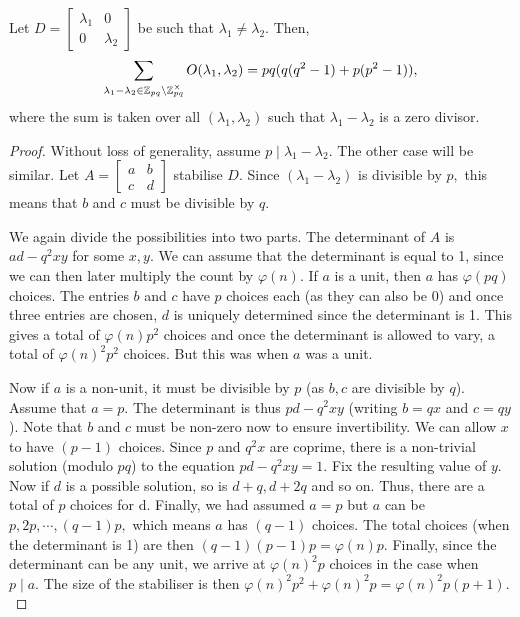 \documentclass[11pt, titlepage, a4paper]{article}
\begin{document}
\begin{proposition}\label{o2}
 Let $D = \begin{bmatrix}
 \lambda_{1} & 0 \\
 0 & \lambda_{2}
\end{bmatrix}$ be such that $\lambda_{1}\neq \lambda_{2}.$ Then,
\begin{align*}
\sum_{\lambda_{1}-\lambda_{2} \in \mathbb{Z}_{pq} \backslash \mathbb{Z}_{pq}^{\times}} O(\lambda_{1},\lambda_{2}) = pq(q(q^{2}-1)+p(p^{2}-1)),
\end{align*}
where the sum is taken over all $(\lambda_{1},\lambda_{2})$ such that $\lambda_{1}-\lambda_{2}$ is a zero divisor.
\end{proposition}
\begin{proof}
 Without loss of generality, assume $p \mid \lambda_{1}-\lambda_{2}.$ The other case will be similar. Let $A= \begin{bmatrix}
a & b \\
 c & d
\end{bmatrix}$ stabilise $D.$ Since $(\lambda_{1}-\lambda_{2})$ is divisible by $p,$ this means that $b$ and $c$ must be divisible by $q.$

We again divide the possibilities into two parts. The determinant of $A$ is $ad-q^{2}xy$ for some $x,y.$ We can assume that the determinant is equal to 1, since we can then later multiply the count by $\varphi(n).$ If $a$ is a unit, then $a$ has $\varphi(pq)$ choices. The entries $b$ and $c$ have $p$ choices each (as they can also be 0) and once three entries are chosen, $d$ is uniquely determined since the determinant is 1. This gives a total of $\varphi(n)p^{2}$ choices and once the determinant is allowed to vary, a total of $\varphi(n)^{2}p^{2}$ choices. But this was when $a$ was a unit. 

Now if $a$ is a non-unit, it must be divisible by $p$ (as $b,c$ are divisible by $q$). Assume that $a=p.$ The determinant is thus $pd - q^{2}xy$ (writing $b=qx$ and $c=qy$). Note that $b$ and $c$ must be non-zero now to ensure invertibility. We can allow $x$ to have $(p-1)$ choices. Since $p$ and $q^{2}x$ are coprime, there is a non-trivial solution (modulo $pq$) to the equation $pd-q^{2}xy=1.$ Fix the resulting value of $y.$ Now if $d$ is a possible solution, so is $d+q, d+2q$ and so on. Thus, there are a total of $p$ choices for d. Finally, we had assumed $a=p$ but $a$ can be $p,2p,\cdots, (q-1)p,$ which means $a$ has $(q-1)$ choices. The total choices (when the determinant is 1) are then $(q-1)(p-1)p= \varphi(n)p.$ Finally, since the determinant can be any unit, we arrive at $\varphi(n)^{2}p$ choices in the case when $p\mid a.$ The size of the stabiliser is then $\varphi(n)^{2}p^{2} +\varphi(n)^{2}p = \varphi(n)^{2}p(p+1).$


\end{proof}
\end{document}
